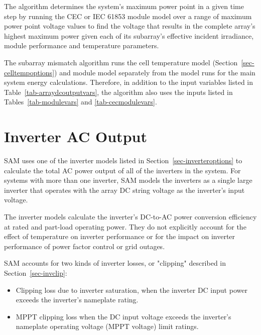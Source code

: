 \documentclass[12pt,letterpaper]{article}
\begin{document}
The algorithm determines the system's maximum power point in a given time step by running the CEC or IEC 61853 module model over a range of maximum power point voltage values to find the voltage that results in the complete array's highest maximum power given each of its subarray's effective incident irradiance, module performance and temperature parameters.

The subarray mismatch algorithm runs the cell temperature model (Section~\ref{sec-celltempoptions}) and module model separately from the model runs for the main system energy calculations. Therefore, in addition to the input variables listed in Table~\ref{tab-arraydcoutputvars}, the algorithm also uses the inputs listed in Tables~\ref{tab-modulevars} and \ref{tab-cecmodulevars}.

\chapter{Inverter AC Output}\label{sec-inverter}

SAM uses one of the inverter models listed in Section~\ref{sec-inverteroptions} to calculate the total AC power output of all of the inverters in the system. For systems with more than one inverter, SAM models the inverters as a single large inverter that operates with the array DC string voltage as the inverter's input voltage. 

The inverter models calculate the inverter's DC-to-AC power conversion efficiency at rated and part-load operating power. They do not explicitly account for the effect of temperature on inverter performance or for the impact on inverter performance of power factor control or grid outages. 

SAM accounts for two kinds of inverter losses, or "clipping" described in Section~\ref{sec-invclip}:

\begin{itemize}
\item Clipping loss due to inverter saturation, when the inverter DC input power exceeds the inverter's nameplate rating.
\item MPPT clipping loss when the DC input voltage exceeds the inverter's nameplate operating voltage (MPPT voltage) limit ratings.
\end{itemize}
\end{document}
